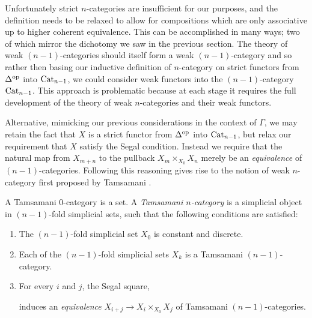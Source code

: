\documentclass[a4paper]{amsart}
\begin{document}
\noindent Unfortunately strict $n$-categories are  insufficient for our purposes, and the definition needs to be relaxed to allow for compositions which are only associative up to higher coherent equivalence. This can be accomplished in many ways; two of which mirror the dichotomy we saw in the previous section. The theory of weak $(n-1)$-categories should itself form a weak $(n-1)$-category and so rather then basing our inductive definition of $n$-category on strict functors from $\Delta^{\mathrm{op}}$ into $\mathrm{Cat}_{n-1}$, we could consider weak functors into the $(n-1)$-category $\mathrm{Cat}_{n-1}$. This approach is problematic because at each stage it requires the full development of the theory of weak $n$-categories and their weak functors.    

Alternative, mimicking our previous considerations in the context of $\Gamma$,  we may retain the fact that $X$ is a strict functor from $\Delta^{\mathrm{op}}$ into $\mathrm{Cat}_{n-1}$, but relax our requirement that $X$ satisfy the Segal condition. Instead we require that the natural map from $X_{m+n}$ to the pullback $X_m \times_{X_0} X_n$ merely be an {\em equivalence} of $(n-1)$-categories. Following this reasoning gives rise to the notion of weak $n$-category first proposed by Tamsamani \cite{Tamsamani:thesis}.   




\begin{definition}[Sketch]
	A Tamsamani $0$-category is a set. 	A {\em Tamsamani $n$-category} is a simplicial object in $(n-1)$-fold simplicial sets, such that the following conditions are satisfied: %
	\begin{enumerate}
		\item The $(n-1)$-fold simplicial set $X_0$ is constant and discrete.
		\item Each of the $(n-1)$-fold simplicial sets $X_k$ is a Tamsamani $(n-1)$-category.
		\item For every $i$ and $j$, the Segal square,
		\begin{center}
		\end{center}
		induces an {\em equivalence} $X_{i+j} \to X_i \times_{X_0} X_j$ of Tamsamani $(n-1)$-categories.
	\end{enumerate}
\end{definition}  
\end{document}
